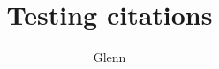 \documentclass[12pt]{article}
\title{Testing citations}
\author{Glenn}
\begin{document}
\maketitle


%
%


\nocite{*}
%
%
\end{document}
